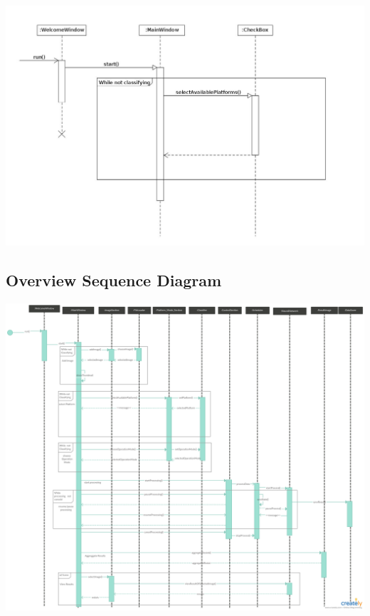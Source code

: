 \documentclass[parskip=full]{scrartcl}
\begin{document}
\begin{center}
\includegraphics[angle=90,origin=c,height=1.0\textwidth]{SelectPlatforms.jpg}
\end{center}

\subsection {Overview Sequence Diagram}

\begin{center}
\includegraphics[angle=90,origin=c,height=1.0\textwidth]{seq.png}
\end{center}
\end{document}
